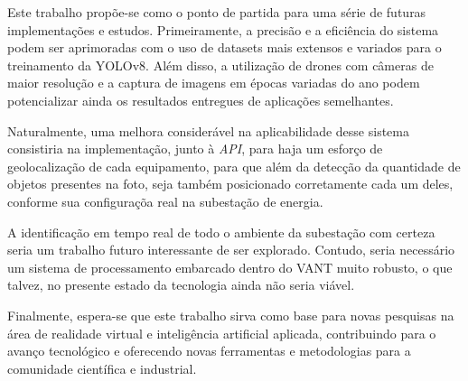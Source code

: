 Este trabalho propõe-se como o ponto de partida para uma série de futuras implementações e estudos. Primeiramente, a precisão e a eficiência do sistema podem ser aprimoradas com o uso de datasets mais extensos e variados para o treinamento da YOLOv8. Além disso, a utilização de drones com câmeras de maior resolução e a captura de imagens em épocas variadas do ano podem potencializar ainda os resultados entregues de aplicações semelhantes.

Naturalmente, uma melhora considerável na aplicabilidade desse sistema consistiria na implementação, junto à \textit{API}, para haja um esforço de geolocalização de cada equipamento, para que além da detecção da quantidade de objetos presentes na foto, seja também posicionado corretamente cada um deles, conforme sua configuraçõa real na subestação de energia. 

A identificação em tempo real de todo o ambiente da subestação com certeza seria um trabalho futuro interessante de ser explorado. Contudo, seria necessário um sistema de processamento embarcado dentro do VANT muito robusto, o que talvez, no presente estado da tecnologia ainda não seria viável.
 
Finalmente, espera-se que este trabalho sirva como base para novas pesquisas na área de realidade virtual e inteligência artificial aplicada, contribuindo para o avanço tecnológico e oferecendo novas ferramentas e metodologias para a comunidade científica e industrial.
